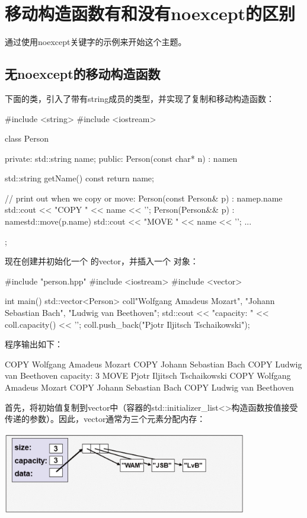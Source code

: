 \section{移动构造函数有和没有noexcept的区别}
通过使用noexcept关键字的示例来开始这个主题。

\subsection{无noexcept的移动构造函数}

下面的类，引入了带有string成员的类型，并实现了复制和移动构造函数：

\begin{cppcode}
#include <string>
#include <iostream>

class Person {
	private:
	std::string name;
	public:
	Person(const char* n)
	: name{n} {
	}

	std::string getName() const {
		return name;
	}

	// print out when we copy or move:
	Person(const Person& p)
	: name{p.name} {
		std::cout << "COPY " << name << '\n';
	}
	Person(Person&& p)
	: name{std::move(p.name)} {
		std::cout << "MOVE " << name << '\n';
	}
	...
};
\end{cppcode}

现在创建并初始化一个  的vector，并插入一个  对象：

\begin{cppcode}
#include "person.hpp"
#include <iostream>
#include <vector>

int main()
{
	std::vector<Person> coll{"Wolfgang Amadeus Mozart",
		"Johann Sebastian Bach",
		"Ludwig van Beethoven"};
	std::cout << "capacity: " << coll.capacity() << '\n';
	coll.push_back("Pjotr Iljitsch Tschaikowski");
}
\end{cppcode}

程序输出如下：

\begin{outputcode}
COPY Wolfgang Amadeus Mozart
COPY Johann Sebastian Bach
COPY Ludwig van Beethoven
capacity: 3
MOVE Pjotr Iljitsch Tschaikowski
COPY Wolfgang Amadeus Mozart
COPY Johann Sebastian Bach
COPY Ludwig van Beethoven
\end{outputcode}

首先，将初始值复制到vector中（容器的std::initializer_list<>构造函数按值接受传递的参数）。因此，vector通常为三个元素分配内存：

\begin{center}
	\includegraphics[width=0.8\textwidth]{part1/ch7/images/1}
\end{center}

